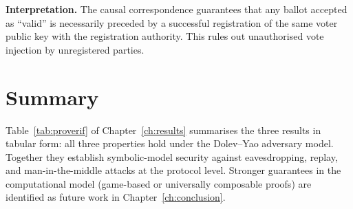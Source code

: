 \textbf{Interpretation.} The causal correspondence guarantees that any ballot accepted as ``valid'' is necessarily preceded by a successful registration of the same voter public key with the registration authority. This rules out unauthorised vote injection by unregistered parties.

\section{Summary}
\label{sec:appx-proverif-summary}

Table~\ref{tab:proverif} of Chapter~\ref{ch:results} summarises the three results in tabular form: all three properties hold under the Dolev--Yao adversary model. Together they establish symbolic-model security against eavesdropping, replay, and man-in-the-middle attacks at the protocol level. Stronger guarantees in the computational model (game-based or universally composable proofs) are identified as future work in Chapter~\ref{ch:conclusion}.
